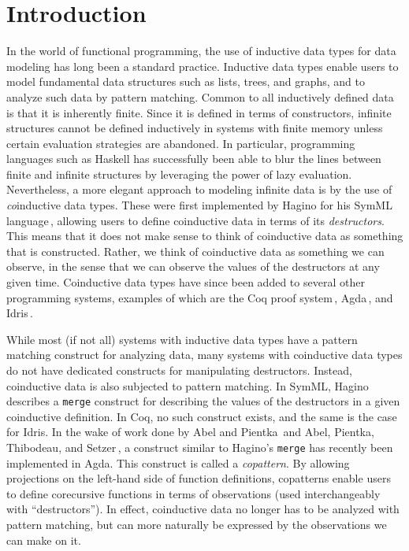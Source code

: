 \section{Introduction}
\label{sec:introduction}

In the world of functional programming, the use of inductive data types for data modeling has long been a standard practice. Inductive data types enable users to model fundamental data structures such as lists, trees, and graphs, and to analyze such data by pattern matching. Common to all inductively defined data is that it is inherently finite. Since it is defined in terms of constructors, infinite structures cannot be defined inductively in systems with finite memory unless certain evaluation strategies are abandoned. In particular, programming languages such as Haskell has successfully been able to blur the lines between finite and infinite structures by leveraging the power of lazy evaluation. Nevertheless, a more elegant approach to modeling infinite data is by the use of \emph{co}inductive data types. These were first implemented by Hagino for his SymML language\,\citep{Hagino89}, allowing users to define coinductive data in terms of its \emph{destructors}. This means that it does not make sense to think of coinductive data as something that is constructed. Rather, we think of coinductive data as something we can observe, in the sense that we can observe the values of the destructors at any given time. Coinductive data types have since been added to several other programming systems, examples of which are the Coq proof system\,\citep{Coq:manual}, Agda\,\citep{Norell:thesis}, and Idris\,\citep{BradyIdrisImpl13}.

While most (if not all) systems with inductive data types have a pattern matching construct for analyzing data, many systems with coinductive data types do not have dedicated constructs for manipulating destructors. Instead, coinductive data is also subjected to pattern matching. In SymML, Hagino describes a \texttt{merge} construct for describing the values of the destructors in a given coinductive definition. In Coq, no such construct exists, and the same is the case for Idris. In the wake of work done by Abel and Pientka\,\citep{Abel13Wellfounded} and Abel, Pientka, Thibodeau, and Setzer\,\citep{Abel13Copatterns}, a construct similar to Hagino's \texttt{merge} has recently been implemented in Agda. This construct is called a \emph{copattern}. By allowing projections on the left-hand side of function definitions, copatterns enable users to define corecursive functions in terms of observations (used interchangeably with ``destructors''). In effect, coinductive data no longer has to be analyzed with pattern matching, but can more naturally be expressed by the observations we can make on it. 

